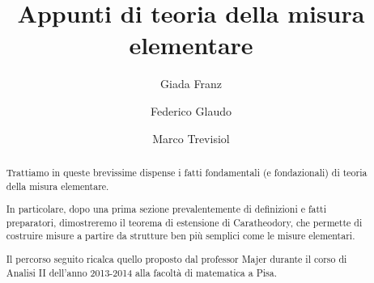 \documentclass[a4paper,12pt]{article}
\title{Appunti di teoria della misura elementare}
\author{Giada Franz \and Federico Glaudo \and Marco Trevisiol}
\begin{document}
\maketitle


\begin{abstract}
	Trattiamo in queste brevissime dispense i fatti fondamentali (e fondazionali) di teoria della misura elementare.
	
	In particolare, dopo una prima sezione prevalentemente di definizioni e fatti preparatori, dimostreremo il teorema di estensione di Caratheodory, che permette di costruire misure a partire da strutture ben più semplici come le misure elementari.
	
	Il percorso seguito ricalca quello proposto dal professor Majer durante il corso di Analisi II dell'anno 2013-2014 alla facoltà di matematica a Pisa.
\end{abstract}
\clearpage









\end{document}
